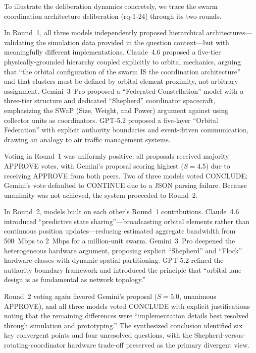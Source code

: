 \documentclass[11pt,a4paper]{article}
\begin{document}
To illustrate the deliberation dynamics concretely, we trace the swarm coordination architecture deliberation (rq-1-24) through its two rounds.

In Round~1, all three models independently proposed hierarchical architectures---validating the simulation data provided in the question context---but with meaningfully different implementations. Claude~4.6 proposed a five-tier physically-grounded hierarchy coupled explicitly to orbital mechanics, arguing that ``the orbital configuration of the swarm IS the coordination architecture'' and that clusters must be defined by orbital element proximity, not arbitrary assignment. Gemini~3~Pro proposed a ``Federated Constellation'' model with a three-tier structure and dedicated ``Shepherd'' coordinator spacecraft, emphasizing the SWaP (Size, Weight, and Power) argument against using collector units as coordinators. GPT-5.2 proposed a five-layer ``Orbital Federation'' with explicit authority boundaries and event-driven communication, drawing an analogy to air traffic management systems.

Voting in Round~1 was uniformly positive: all proposals received majority APPROVE votes, with Gemini's proposal scoring highest ($S = 4.5$) due to receiving APPROVE from both peers. Two of three models voted CONCLUDE; Gemini's vote defaulted to CONTINUE due to a JSON parsing failure. Because unanimity was not achieved, the system proceeded to Round~2.

In Round~2, models built on each other's Round~1 contributions. Claude~4.6 introduced ``predictive state sharing''---broadcasting orbital elements rather than continuous position updates---reducing estimated aggregate bandwidth from 500~Mbps to 2~Mbps for a million-unit swarm. Gemini~3~Pro deepened the heterogeneous hardware argument, proposing explicit ``Shepherd'' and ``Flock'' hardware classes with dynamic spatial partitioning. GPT-5.2 refined the authority boundary framework and introduced the principle that ``orbital lane design is as fundamental as network topology.''

Round~2 voting again favored Gemini's proposal ($S = 5.0$, unanimous APPROVE), and all three models voted CONCLUDE with explicit justifications noting that the remaining differences were ``implementation details best resolved through simulation and prototyping.'' The synthesized conclusion identified six key convergent points and four unresolved questions, with the Shepherd-versus-rotating-coordinator hardware trade-off preserved as the primary divergent view.
\end{document}
